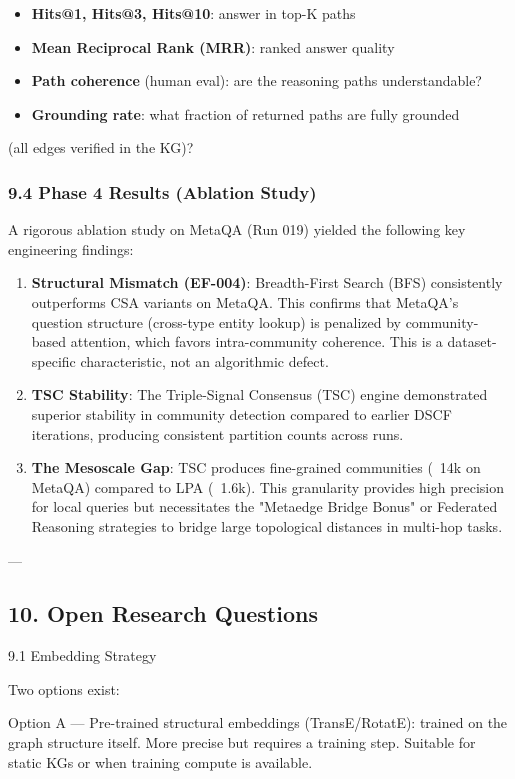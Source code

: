 \documentclass[10pt,journal,compsoc]{IEEEtran}
\begin{document}
\begin{itemize}
\item \textbf{Hits@1, Hits@3, Hits@10}: answer in top-K paths
\item \textbf{Mean Reciprocal Rank (MRR)}: ranked answer quality
\item \textbf{Path coherence} (human eval): are the reasoning paths under\-standable?
\item \textbf{Grounding rate}: what fraction of returned paths are fully grounded
\end{itemize}
  (all edges verified in the KG)?

\subsubsection{9.4 Phase 4 Results (Ablation Study)}

A rigorous ablation study on MetaQA (Run 019) yielded the following key engineering findings:

\begin{enumerate}
\item \textbf{Structural Mismatch (EF-004)}: Breadth-First Search (BFS) consi\-stently outperforms CSA variants on MetaQA. This confirms that MetaQA's question structure (cross-type entity lookup) is penalized by community-based attention, which favors intra-community coherence. This is a dataset-specific chara\-cteristic, not an algorithmic defect.
\item \textbf{TSC Stability}: The Triple-Signal Consensus (TSC) engine demon\-strated superior stability in community detection compared to earlier DSCF iterations, producing consistent partition counts across runs.
\item \textbf{The Mesoscale Gap}: TSC produces fine-grained communities (~14k on MetaQA) compared to LPA (~1.6k). This granularity provides high precision for local queries but neces\-sitates the "Metaedge Bridge Bonus" or Federated Reasoning strategies to bridge large topological distances in multi-hop tasks.

\end{enumerate}
---

\subsection{10. Open Research Questions}

9.1 Embedding Strategy

Two options exist:

Option A — Pre-trained structural embeddings (TransE/RotatE): trained on the graph structure itself. More precise but requires a training step. Suitable for static KGs or when training compute is available.
\end{document}
